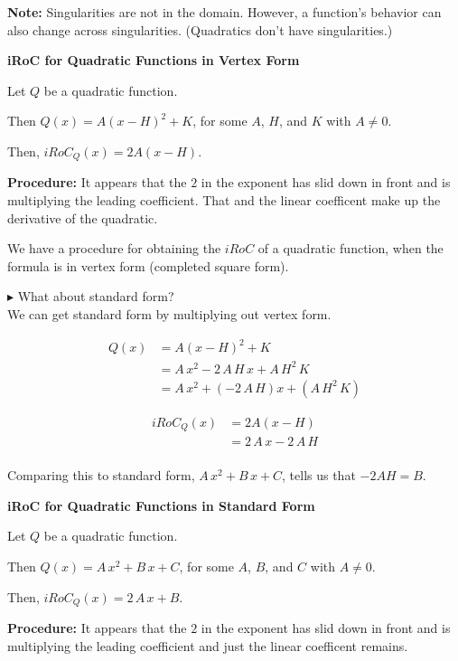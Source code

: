 \documentclass{ximera}
\begin{document}
\textbf{Note: } Singularities are not in the domain. However, a function's behavior can also change across singularities. (Quadratics don't have singularities.)


\begin{procedure} \textbf{\textcolor{purple!30!blue}{iRoC for Quadratic Functions in Vertex Form}} 



Let $Q$ be a quadratic function.

Then $Q(x) = A (x - H)^2 + K$, for some $A$, $H$, and $K$ with $A \ne 0$. 

Then, $iRoC_Q(x) = 2 A (x - H)$. 


\textbf{Procedure:} It appears that the $2$ in the exponent has slid down in front and is multiplying the leading coefficient. That and the linear coefficent make up the derivative of the quadratic. 



\end{procedure}



We have a procedure for obtaining the $iRoC$ of a quadratic function, when the formula is in vertex form (completed square form). 

\textbf{\textcolor{blue!55!black}{$\blacktriangleright$}} What about standard form? \\
We can get standard form by multiplying out vertex form. 



\begin{align*}
Q(x) & = A (x - H)^2 + K \\
     & = A \, x^2 - 2 \, A \, H \, x + A \, H^2 \, K \\
     & = A \, x^2  + (- 2 \, A \, H) x + (A \, H^2 \, K) 
\end{align*}


\begin{align*}
iRoC_Q(x) &= 2 A (x - H) \\
          & = 2 \, A \, x - 2 \, A \, H  \\
\end{align*}


Comparing this to standard form, $A \, x^2 + B \, x + C$, tells us that $-2AH = B$. \\


\begin{procedure} \textbf{\textcolor{purple!30!blue}{iRoC for Quadratic Functions in Standard Form}} 



Let $Q$ be a quadratic function.

Then $Q(x) = A \, x^2 + B \, x + C$, for some $A$, $B$, and $C$ with $A \ne 0$. 

Then, $iRoC_Q(x) = 2 \, A \, x + B$. 


\textbf{Procedure:} It appears that the $2$ in the exponent has slid down in front and is multiplying the leading coefficient and just the linear coefficent remains. 



\end{procedure}
\end{document}
